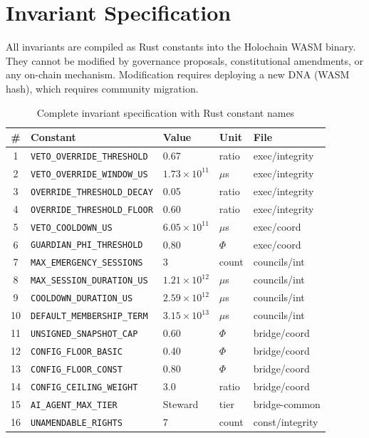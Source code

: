 \documentclass[11pt,a4paper]{article}
\begin{document}
\appendix

\section{Invariant Specification}
\label{app:invariants}

All invariants are compiled as Rust constants into the Holochain WASM binary. They cannot be modified by governance proposals, constitutional amendments, or any on-chain mechanism. Modification requires deploying a new DNA (WASM hash), which requires community migration.

\begin{table}[h]
\centering
\caption{Complete invariant specification with Rust constant names}
\label{tab:invariants_full}
\small
\begin{tabular}{cllll}
\toprule
\textbf{\#} & \textbf{Constant} & \textbf{Value} & \textbf{Unit} & \textbf{File} \\
\midrule
1 & \texttt{VETO\_OVERRIDE\_THRESHOLD} & 0.67 & ratio & exec/integrity \\
2 & \texttt{VETO\_OVERRIDE\_WINDOW\_US} & $1.73 \times 10^{11}$ & $\mu$s & exec/integrity \\
3 & \texttt{OVERRIDE\_THRESHOLD\_DECAY} & 0.05 & ratio & exec/integrity \\
4 & \texttt{OVERRIDE\_THRESHOLD\_FLOOR} & 0.60 & ratio & exec/integrity \\
5 & \texttt{VETO\_COOLDOWN\_US} & $6.05 \times 10^{11}$ & $\mu$s & exec/coord \\
6 & \texttt{GUARDIAN\_PHI\_THRESHOLD} & 0.80 & $\Phi$ & exec/coord \\
7 & \texttt{MAX\_EMERGENCY\_SESSIONS} & 3 & count & councils/int \\
8 & \texttt{MAX\_SESSION\_DURATION\_US} & $1.21 \times 10^{12}$ & $\mu$s & councils/int \\
9 & \texttt{COOLDOWN\_DURATION\_US} & $2.59 \times 10^{12}$ & $\mu$s & councils/int \\
10 & \texttt{DEFAULT\_MEMBERSHIP\_TERM} & $3.15 \times 10^{13}$ & $\mu$s & councils/int \\
11 & \texttt{UNSIGNED\_SNAPSHOT\_CAP} & 0.60 & $\Phi$ & bridge/coord \\
12 & \texttt{CONFIG\_FLOOR\_BASIC} & 0.40 & $\Phi$ & bridge/coord \\
13 & \texttt{CONFIG\_FLOOR\_CONST} & 0.80 & $\Phi$ & bridge/coord \\
14 & \texttt{CONFIG\_CEILING\_WEIGHT} & 3.0 & ratio & bridge/coord \\
15 & \texttt{AI\_AGENT\_MAX\_TIER} & Steward & tier & bridge-common \\
16 & \texttt{UNAMENDABLE\_RIGHTS} & 7 & count & const/integrity \\
\bottomrule
\end{tabular}
\end{table}
\end{document}
